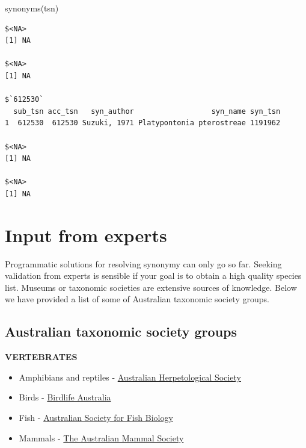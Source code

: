 \documentclass[
  letterpaper,
  DIV=11,
  numbers=noendperiod,
  oneside]{scrreprt}
\newenvironment{Shaded}{\begin{snugshade}}{\end{snugshade}}
\newcommand{\FunctionTok}[1]{\textcolor[rgb]{0.28,0.35,0.67}{#1}}
\newcommand{\NormalTok}[1]{\textcolor[rgb]{0.00,0.23,0.31}{#1}}
\providecommand{\tightlist}{%
  \setlength{\itemsep}{0pt}\setlength{\parskip}{0pt}}\usepackage{longtable,booktabs,array}
\begin{document}
\begin{Shaded}
\begin{Highlighting}[]
\FunctionTok{synonyms}\NormalTok{(tsn)}
\end{Highlighting}
\end{Shaded}

\begin{verbatim}
$<NA>
[1] NA

$<NA>
[1] NA

$`612530`
  sub_tsn acc_tsn   syn_author                  syn_name syn_tsn
1  612530  612530 Suzuki, 1971 Platypontonia pterostreae 1191962

$<NA>
[1] NA

$<NA>
[1] NA
\end{verbatim}

\hypertarget{input-from-experts}{%
\section{Input from experts}\label{input-from-experts}}

Programmatic solutions for resolving synonymy can only go so far.
Seeking validation from experts is sensible if your goal is to obtain a
high quality species list. Museums or taxonomic societies are extensive
sources of knowledge. Below we have provided a list of some of
Australian taxonomic society groups.

\hypertarget{australian-taxonomic-society-groups}{%
\subsection{Australian taxonomic society
groups}\label{australian-taxonomic-society-groups}}

\textbf{VERTEBRATES}

\begin{itemize}
\tightlist
\item
  Amphibians and reptiles - \href{https://ahs.org.au/}{Australian
  Herpetological Society}\\
\item
  Birds - \href{https://www.birdlife.org.au/}{Birdlife Australia}\\
\item
  Fish - \href{https://www.asfb.org.au/}{Australian Society for Fish
  Biology}\\
\item
  Mammals - \href{https://australianmammals.org.au/}{The Australian
  Mammal Society}
\end{itemize}
\end{document}
